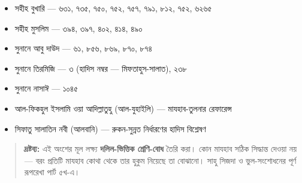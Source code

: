 \begin{itemize}
\item সহীহ বুখারি — ৬৩১, ৭৩৫, ৭৫০, ৭৫২, ৭৫৭, ৭৯১, ৮১২, ৭৫২, ৬২৬৫
\item সহীহ মুসলিম — ৩৯৪, ৩৯৭, ৪০২, ৪১৪, ৪৯০
\item সুনানে আবু দাউদ — ৬১, ৮৫৬, ৮৬৯, ৮৭০, ৮৭৪
\item সুনানে তিরমিজি — ৩ (হাদিস নম্বর — মিফতাহুস-সালাত), ২৩৮
\item সুনানে নাসাঈ — ১০৪৫
\item আল-ফিকহুল ইসলামি ওয়া আদিল্লাতুহু (আল-যুহাইলি) — মাযহাব-তুলনার রেফারেন্স
\item সিফাতু সালাতিন নবী (আলবানি) — রুকন-সুন্নত নির্ধারণের হাদিস বিশ্লেষণ
\end{itemize}
\begin{quote}
\textbf{দ্রষ্টব্য:} এই অংশের মূল লক্ষ্য \textbf{দলিল-ভিত্তিক শ্রেণি-বোধ} তৈরি করা। কোন মাযহাব সঠিক সিদ্ধান্ত দেওয়া নয় — বরং প্রতিটি মাযহাব কোথা থেকে তার হুকুম নিয়েছে তা বোঝানো। সাহু সিজদা ও ভুল-সংশোধনের পূর্ণ রূপরেখা পার্ট ৫খ-এ।
\end{quote}


